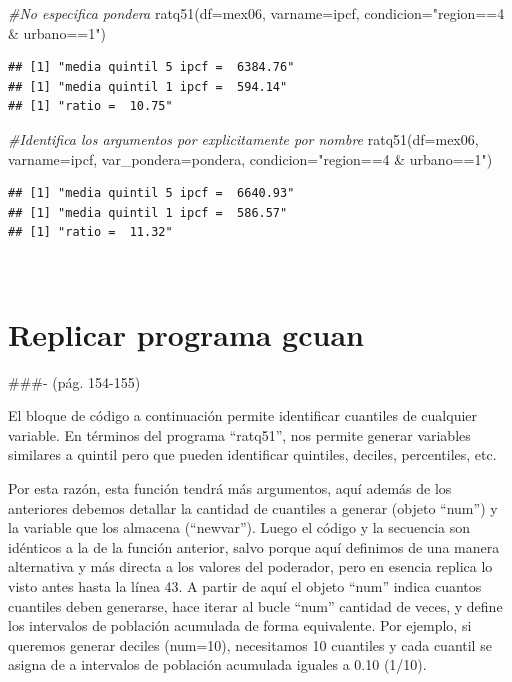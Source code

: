 \documentclass[
]{book}
\newenvironment{Shaded}{\begin{snugshade}}{\end{snugshade}}
\newcommand{\AttributeTok}[1]{\textcolor[rgb]{0.77,0.63,0.00}{#1}}
\newcommand{\CommentTok}[1]{\textcolor[rgb]{0.56,0.35,0.01}{\textit{#1}}}
\newcommand{\FunctionTok}[1]{\textcolor[rgb]{0.00,0.00,0.00}{#1}}
\newcommand{\NormalTok}[1]{#1}
\newcommand{\StringTok}[1]{\textcolor[rgb]{0.31,0.60,0.02}{#1}}
\begin{document}
\begin{Shaded}
\begin{Highlighting}[]
\CommentTok{\#No especifica pondera}
\FunctionTok{ratq51}\NormalTok{(}\AttributeTok{df=}\NormalTok{mex06, }\AttributeTok{varname=}\NormalTok{ipcf, }\AttributeTok{condicion=}\StringTok{"region==4 \& urbano==1"}\NormalTok{)  }
\end{Highlighting}
\end{Shaded}

\begin{verbatim}
## [1] "media quintil 5 ipcf =  6384.76"
## [1] "media quintil 1 ipcf =  594.14"
## [1] "ratio =  10.75"
\end{verbatim}

\begin{Shaded}
\begin{Highlighting}[]
\CommentTok{\#Identifica los argumentos por explicitamente por nombre }
\FunctionTok{ratq51}\NormalTok{(}\AttributeTok{df=}\NormalTok{mex06, }\AttributeTok{varname=}\NormalTok{ipcf, }\AttributeTok{var\_pondera=}\NormalTok{pondera, }\AttributeTok{condicion=}\StringTok{"region==4 \& urbano==1"}\NormalTok{) }
\end{Highlighting}
\end{Shaded}

\begin{verbatim}
## [1] "media quintil 5 ipcf =  6640.93"
## [1] "media quintil 1 ipcf =  586.57"
## [1] "ratio =  11.32"
\end{verbatim}

~

\hypertarget{replicar-programa-gcuan}{%
\section{Replicar programa gcuan}\label{replicar-programa-gcuan}}

\#\#\#- (pág. 154-155)

El bloque de código a continuación permite identificar cuantiles de cualquier variable. En términos del programa ``ratq51'', nos permite generar variables similares a quintil pero que pueden identificar quintiles, deciles, percentiles, etc.

Por esta razón, esta función tendrá más argumentos, aquí además de los anteriores debemos detallar la cantidad de cuantiles a generar (objeto ``num'') y la variable que los almacena (``newvar''). Luego el código y la secuencia son idénticos a la de la función anterior, salvo porque aquí definimos de una manera alternativa y más directa a los valores del poderador, pero en esencia replica lo visto antes hasta la línea 43. A partir de aquí el objeto ``num'' indica cuantos cuantiles deben generarse, hace iterar al bucle ``num'' cantidad de veces, y define los intervalos de población acumulada de forma equivalente. Por ejemplo, si queremos generar deciles (num=10), necesitamos 10 cuantiles y cada cuantil se asigna de a intervalos de población acumulada iguales a 0.10 (1/10).
\end{document}
